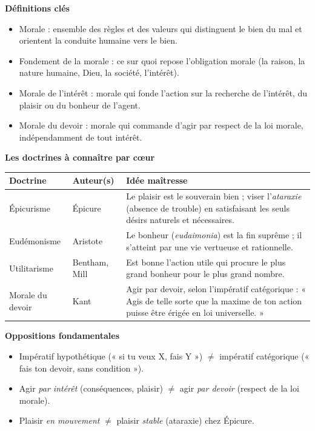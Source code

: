 \documentclass[11pt]{article}
\newcommand{\cle}[1]{{\popxbold\color{popdark}#1}}
\begin{document}
\begin{bilan}
\textbf{Définitions clés}
\begin{itemize}
\item \cle{Morale} : ensemble des règles et des valeurs qui distinguent le \cle{bien} du \cle{mal} et orientent la conduite humaine vers le bien.
\item \cle{Fondement de la morale} : ce sur quoi repose l'obligation morale (la raison, la nature humaine, Dieu, la société, l'intérêt).
\item \cle{Morale de l'intérêt} : morale qui fonde l'action sur la recherche de l'intérêt, du plaisir ou du bonheur de l'agent.
\item \cle{Morale du devoir} : morale qui commande d'agir par respect de la loi morale, indépendamment de tout intérêt.
\end{itemize}

\textbf{Les doctrines à connaître par c\oe ur}
\begin{center}
\begin{tabularx}{\linewidth}{|l|X|X|}
\hline
\rowcolor{popblueL} \textbf{Doctrine} & \textbf{Auteur(s)} & \textbf{Idée maîtresse} \\
\hline
Épicurisme & Épicure & Le plaisir est le souverain bien ; viser l'\emph{ataraxie} (absence de trouble) en satisfaisant les seuls désirs naturels et nécessaires. \\
\hline
Eudémonisme & Aristote & Le bonheur (\emph{eudaimonia}) est la fin suprême ; il s'atteint par une vie vertueuse et rationnelle. \\
\hline
Utilitarisme & Bentham, Mill & Est bonne l'action utile qui procure le plus grand bonheur pour le plus grand nombre. \\
\hline
Morale du devoir & Kant & Agir par \cle{devoir}, selon l'\cle{impératif catégorique} : « Agis de telle sorte que la maxime de ton action puisse être érigée en loi universelle. » \\
\hline
\end{tabularx}
\end{center}

\textbf{Oppositions fondamentales}
\begin{itemize}
\item Impératif \cle{hypothétique} (« si tu veux X, fais Y ») $\neq$ impératif \cle{catégorique} (« fais ton devoir, sans condition »).
\item Agir \emph{par intérêt} (conséquences, plaisir) $\neq$ agir \emph{par devoir} (respect de la loi morale).
\item Plaisir \emph{en mouvement} $\neq$ plaisir \emph{stable} (ataraxie) chez Épicure.
\end{itemize}


\end{bilan}
\end{document}
